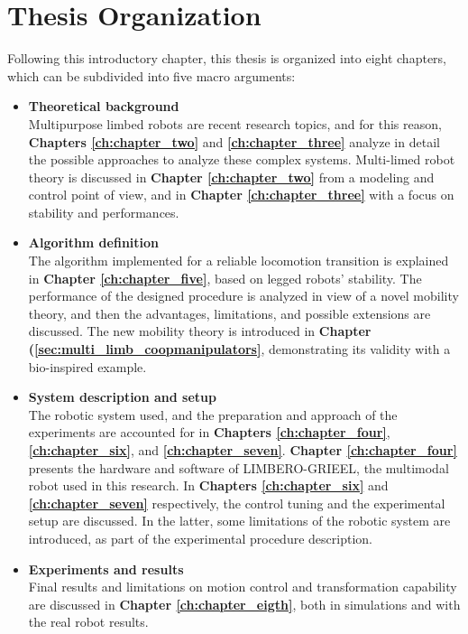 \section{Thesis Organization}
\label{sec:organization}


Following this introductory chapter, this thesis is organized into eight chapters, which can be subdivided into five macro arguments: 
\begin{itemize}

    \item \textbf{Theoretical background}\\
    Multipurpose limbed robots are recent research topics, and for this reason, \textbf{Chapters \ref{ch:chapter_two}} and \textbf{\ref{ch:chapter_three}} analyze in detail the possible approaches to analyze these complex systems.  
    Multi-limed robot theory is discussed in \textbf{Chapter \ref{ch:chapter_two}} from a modeling and control point of view, and in \textbf{Chapter \ref{ch:chapter_three}} with a focus on stability and performances.  
    
    \item \textbf{Algorithm definition }\\
    The algorithm implemented for a reliable locomotion transition is explained in \textbf{Chapter \ref{ch:chapter_five}}, based on legged robots' stability. The performance of the designed procedure is analyzed in view of a novel mobility theory, and then the advantages, limitations, and possible extensions are discussed.
    The new mobility theory is introduced in  
    \textbf{Chapter  (\ref{sec:multi_limb_coopmanipulators}}, demonstrating its validity with a bio-inspired example. 
    
    \item \textbf{System description and setup}\\
    The robotic system used, and the preparation and approach of the experiments are accounted for in \textbf{Chapters \ref{ch:chapter_four}}, \textbf{\ref{ch:chapter_six}}, and \textbf{\ref{ch:chapter_seven}}.
    \textbf{Chapter \ref{ch:chapter_four}} presents the hardware and software of LIMBERO-GRIEEL, the multimodal robot used in this research.  In \textbf{Chapters \ref{ch:chapter_six}} and \textbf{\ref{ch:chapter_seven}} respectively, the control tuning and the experimental setup are discussed. In the latter, some limitations of the robotic system are introduced, as part of the experimental procedure description. 

    \item \textbf{Experiments and results}\\
    Final results and limitations on motion control and transformation capability  are discussed in \textbf{Chapter \ref{ch:chapter_eigth}}, both in simulations and with the real robot results. 


\end{itemize}
